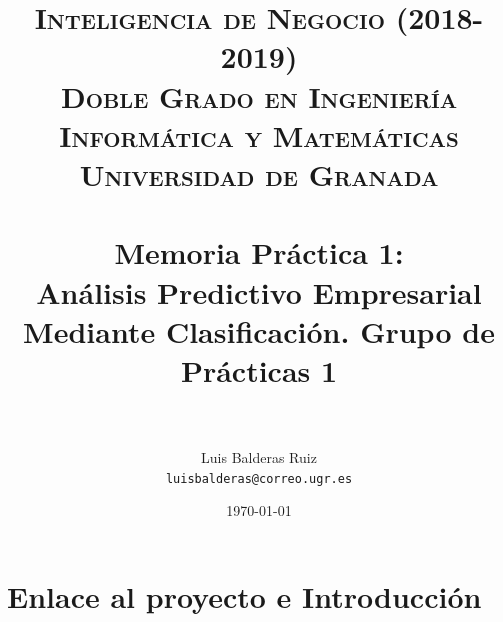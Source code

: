 
\graphicspath{ {./images/} }
\usepackage{subcaption}
\usepackage{hyperref}
\usepackage{soul}


\title{	
\normalfont \normalsize 
\textsc{\textbf{Inteligencia de Negocio (2018-2019)} \\ Doble Grado en Ingeniería Informática y Matemáticas \\ Universidad de Granada} \\ [25pt] %
\horrule{0.5pt} \\[0.4cm] %
\huge Memoria Práctica 1: \\Análisis Predictivo Empresarial Mediante Clasificación. Grupo de Prácticas 1 \\ %
\horrule{2pt} \\[0.5cm] %
}

\author{Luis Balderas Ruiz \\ \texttt{luisbalderas@correo.ugr.es}} 


\date{\normalsize\today} %




\maketitle %

\newpage %

\tableofcontents %

\listoffigures

\listoftables

\newpage



\section{Enlace al proyecto e Introducción}


